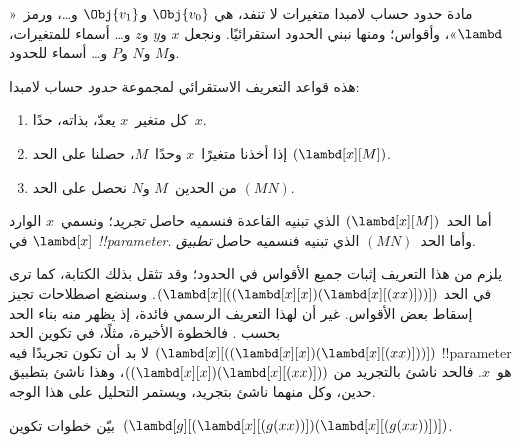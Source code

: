 \documentclass[../../../include/open-logic-section]{subfiles}
\begin{document}

مادة حدود حساب لامبدا متغيرات لا تنفد، هي
$\Obj{v_0}$ و$\Obj{v_1}$ و\dots، ورمز~«$\lambd$»، وأقواس؛ ومنها نبني الحدود استقرائيًا.
ونجعل $x$ و$y$ و$z$ و\dots{} أسماء للمتغيرات، و$M$ و$N$ و$P$ و\dots{} أسماء للحدود.

\begin{defn}[الحدود] 
هذه قواعد التعريف الاستقرائي لمجموعة \emph{حدود} حساب لامبدا:
\begin{enumerate}
  \item {} كل متغير~$x$ يعدّ، بذاته، حدًا~$x$.
  \item {} إذا أخذنا متغيرًا~$x$ وحدًا~$M$، حصلنا على الحد
    $(\lambd[x][M])$.
  \item {} من الحدين~$M$ و$N$ نحصل على الحد
    $(MN)$.
\end{enumerate}
\end{defn}

أما الحد~$(\lambd[x][M])$ الذي تبنيه القاعدة
 فنسميه حاصل \emph{تجريد}؛ ونسمي~$x$ الوارد في
$\lambd[x]$ \emph{!!{parameter}}. وأما الحد~$(MN)$ الذي تبنيه
 فنسميه حاصل \emph{تطبيق}.

يلزم من هذا التعريف إثبات جميع الأقواس في الحدود؛ وقد تثقل بذلك الكتابة، كما ترى في الحد
$(\lambd[x][((\lambd[x][x])(\lambd[x][(xx)]))])$. وسنضع اصطلاحات تجيز إسقاط بعض الأقواس.
غير أن لهذا التعريف الرسمي فائدة، إذ يظهر منه بناء الحد بحسب
. فالخطوة الأخيرة، مثلًا، في تكوين الحد
$(\lambd[x][((\lambd[x][x])(\lambd[x][(xx)]))])$ لا بد أن تكون تجريدًا فيه
!!{parameter} هو~$x$. فالحد ناشئ بالتجريد من
$((\lambd[x][x])(\lambd[x][(xx)]))$، وهذا ناشئ بتطبيق حدين، وكل منهما ناشئ بتجريد، ويستمر التحليل على هذا الوجه.

\begin{prob}
بيّن خطوات تكوين~$(\lambd[g][(\lambd[x][(g (x x))])
  (\lambd[x][(g (x x))])])$.
\end{prob}
\end{document}
